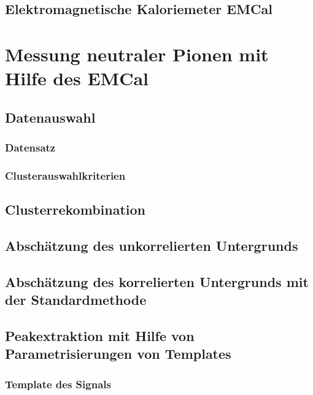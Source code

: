 \documentclass[11pt]{article}
\renewcommand{\,}{,\!} %
\begin{document}
\subsection{Elektromagnetische Kaloriemeter EMCal} \label{s2s2}

\newpage
\section{Messung neutraler Pionen mit Hilfe des EMCal} \label{s3}

\subsection{Datenauswahl} \label{s3s1}

\subsubsection{Datensatz} \label{s3s1s1}

\subsubsection{Clusterauswahlkriterien} \label{s3s1s2}

\subsection{Clusterrekombination} \label{s3s2}

\subsection{Absch{\"a}tzung des unkorrelierten Untergrunds} \label{s3s3}

\subsection{Absch{\"a}tzung des korrelierten Untergrunds mit der Standardmethode} \label{s3s4}


\subsection{Peakextraktion mit Hilfe von Parametrisierungen von Templates} \label{s3s5}


\subsubsection{Template des Signals} \label{s3s5s1}

\end{document}
